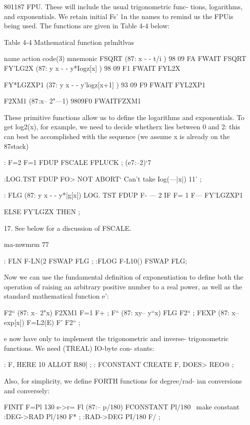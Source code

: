 801187 FPU. These will include the usual trigonometric func-
tions, logarithms, and exponentials. We retain initial Fs' 1n the
names to remind us the FPUis being used. The functions are given
in Table 4-4 below:

Table 4-4 Mathematical function prlmltlvas

 

name action code(3) mnemonic
FSQRT (87: x - - t/i ) 98 09 FA FWAIT FSQRT
FY'LG2X (87: y x - - y*Iogz[x] ) 98 09 F1 FWAIT FYL2X

FY*LGZXP1 (37: y x - - y'logz[x+1] ) 93 09 F9 FWAIT FYL2XP1

F2XM1 (87:x-- 2"—1) 9809F0 FWAITFZXM1

 

 

 

These primitive functions allow us to deﬁne the logarithms and
exponentials. To get log2(x), for example, we need to decide
whetherx lies between 0 and 2: this can best be accomplished with
the sequence (we assume x is already on the 87stack)

: F=2 F=1 FDUP FSCALE FPLUCK ; (e7:--2)‘7

:LOG.TST FDUP FO> NOT
ABORT‘ Can't take Iog(—|x|) 11' ;

: FLG (87: y x - - y*|g[x])
LOG. TST FDUP F- — 2
IF F= 1 F— FY'LGZXP1

ELSE FY'LGZX THEN ;

 

17. See below for a discussion of FSCALE.

ma-mwmrm 77

: FLN F-LN(2 FSWAP FLG ;
:FLOG F-L10() FSWAP FLG;

Now we can use the fundamental deﬁnition of exponentiation to
deﬁne both the operation of raising an arbitrary positive number
to a real power, as well as the standard mathematical function e’:

F2“ (87: x-- 2"x) F2XM1 F=1 F+ ;
F“ (87: xy-- y“x) FLG F2“ ;
FEXP (87: x-- exp[x]) F=L2(E) F' F2“ ;

e now have only to implement the trigonometric and inverse-
trigonometric functions. We need (TREAL) IO-byte con-
stants:

: F, HERE 10 ALLOT R80| ;
: FCONSTANT CREATE F, DOES> REO@ ;

Also, for simplicity, we deﬁne FORTH functions for degree/rad-
ian conversions and conversely:

FINIT F=Pl 130 s->r= Fl (87:-- p/180)
FCONSTANT Pl/180 \ make constant
:DEG->RAD Pl/180 F* ;
:RAD->DEG PI/180 F/ ;

